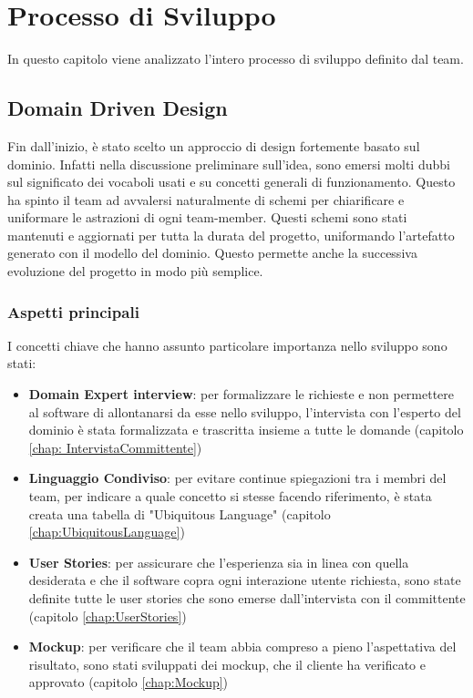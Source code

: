 \chapter{Processo di Sviluppo} \label{chap:dev-process}
In questo capitolo viene analizzato l'intero processo di sviluppo definito dal team.

\section{Domain Driven Design}
 Fin dall'inizio, è stato scelto un approccio di design fortemente basato sul dominio. Infatti nella discussione preliminare sull'idea, sono emersi molti dubbi sul significato dei vocaboli usati e su concetti generali di funzionamento. Questo ha spinto il team ad avvalersi naturalmente di schemi per chiarificare e uniformare le astrazioni di ogni team-member. Questi schemi sono stati mantenuti e aggiornati per tutta la durata del progetto, uniformando l'artefatto generato con il modello del dominio. Questo permette anche la successiva evoluzione del progetto in modo più semplice.
    \subsection{Aspetti principali}
    I concetti chiave che hanno assunto particolare importanza nello sviluppo sono stati:
    \begin{itemize}
        \item \textbf{Domain Expert interview}: per formalizzare le richieste e non permettere al software di allontanarsi da esse nello sviluppo, l'intervista con l'esperto del dominio è stata formalizzata e trascritta insieme a tutte le domande (capitolo \ref{chap: IntervistaCommittente})
        \item \textbf{Linguaggio Condiviso}: per evitare continue spiegazioni tra i membri del team, per indicare a quale concetto si stesse facendo riferimento, è stata creata una tabella di "Ubiquitous Language" (capitolo \ref{chap:UbiquitousLanguage})
        \item \textbf{User Stories}: per assicurare che l'esperienza sia in linea con quella desiderata e che il software copra ogni interazione utente richiesta, sono state definite tutte le user stories che sono emerse dall'intervista con il committente (capitolo \ref{chap:UserStories})
        \item \textbf{Mockup}: per verificare che il team abbia compreso a pieno l'aspettativa del risultato, sono stati sviluppati dei mockup, che il cliente ha verificato e approvato (capitolo \ref{chap:Mockup})
    \end{itemize}

